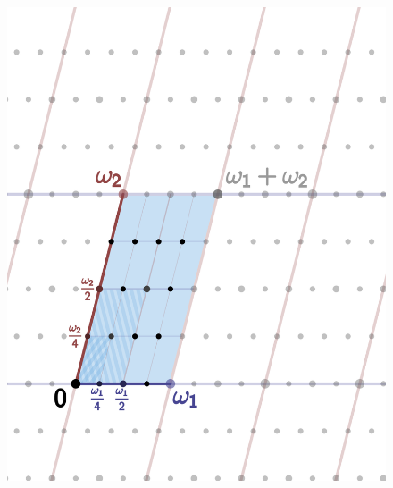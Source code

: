 \begin{frame}[plain]
	\begin{figure}[!ht]
	\centering
	\includegraphics[width=0.7\textheight]{images/lattice.png}
	\end{figure}
\end{frame}




